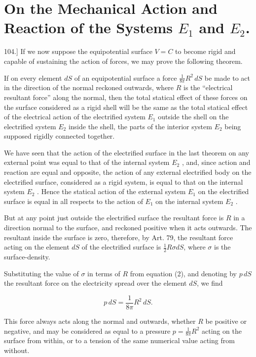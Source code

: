 \documentclass[11pt,a4paper]{article}
\begin{document}
\setcounter{footnote}{0}
\section*{On the Mechanical Action and Reaction of the Systems $E_1$ and $E_2$.}

104.] If we now suppose the equipotential surface $V=C$ to become rigid and capable of sustaining the action of forces, we may prove the following theorem.

If on every element $dS$ of an equipotential surface a force $\frac{1}{8\pi}R^2\,dS$ be made to act in the direction of the normal reckoned outwards, where $R$ is the ``electrical resultant force'' along the normal, then the total statical effect of these forces on the surface considered as a rigid shell will be the same as the total statical effect of the electrical action of the electrified system $E_1$ outside the shell on the electrified system $E_2$ inside the shell, the parts of the interior system $E_2$ being supposed rigidly connected together.

We have seen that the action of the electrified surface in the last theorem on any external point was equal to that of the internal system  $E_2$ , and, since action and reaction are equal and opposite, the action of any external electrified body on the electrified surface, considered as a rigid system, is equal to that on the internal system  $E_2$ . Hence the statical action of the external system  $E_1$  on the electrified surface is equal in all respects to the action of  $E_1$  on the internal system  $E_2$ .

But at any point just outside the electrified surface the resultant force is $R$ in a direction normal to the surface, and reckoned positive when it acts outwards. The resultant inside the surface is zero, therefore, by Art. 79, the resultant force acting on the element $dS$ of the electrified surface is $\frac{1}{2}R\sigma dS$, where $\sigma$ is the surface-density.

Substituting the value of $\sigma$ in terms of $R$ from equation (2), and denoting by $p\,dS$ the resultant force on the electricity spread over the element $dS$, we find

\[
p \, dS = \frac{1}{8\pi} R^2 \, dS.
\]

This force always acts along the normal and outwards, whether $R$ be positive or negative, and may be considered as equal to a pressure $p=\frac{1}{8\pi}R^2$ acting on the surface from within, or to a tension of the same numerical value acting from without.
\end{document}
